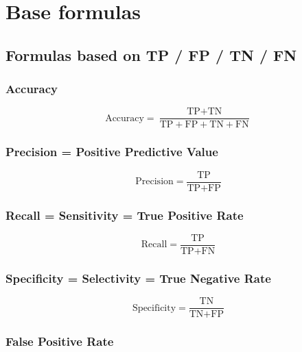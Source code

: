 \documentclass[a4paper,11pt]{article}
\begin{document}
\appendix

\clearpage
\section{Base formulas}

\subsection{Formulas based on TP / FP / TN / FN}

\subsubsection{Accuracy}\label{formula:accuracy}

\begin{equation}
    \textrm{Accuracy} = \frac{\textrm{TP} + \textrm{TN}}{\textrm{TP} + \textrm{FP} + \textrm{TN} + \textrm{FN}}
\end{equation}

\subsubsection{Precision = Positive Predictive Value}\label{formula:precision}

\begin{equation}
    \textrm{Precision} = \frac{\textrm{TP}}{\textrm{TP} + \textrm{FP}}
\end{equation}

\subsubsection{Recall = Sensitivity = True Positive Rate}\label{formula:recall}

\begin{equation}
    \textrm{Recall} = \frac{\textrm{TP}}{\textrm{TP} + \textrm{FN}}
\end{equation}

\subsubsection{Specificity = Selectivity = True Negative Rate}\label{formula:specificity}

\begin{equation}
    \textrm{Specificity} = \frac{\textrm{TN}}{\textrm{TN} + \textrm{FP}}
\end{equation}

\subsubsection{False Positive Rate}\label{formula:fpr}
\end{document}
